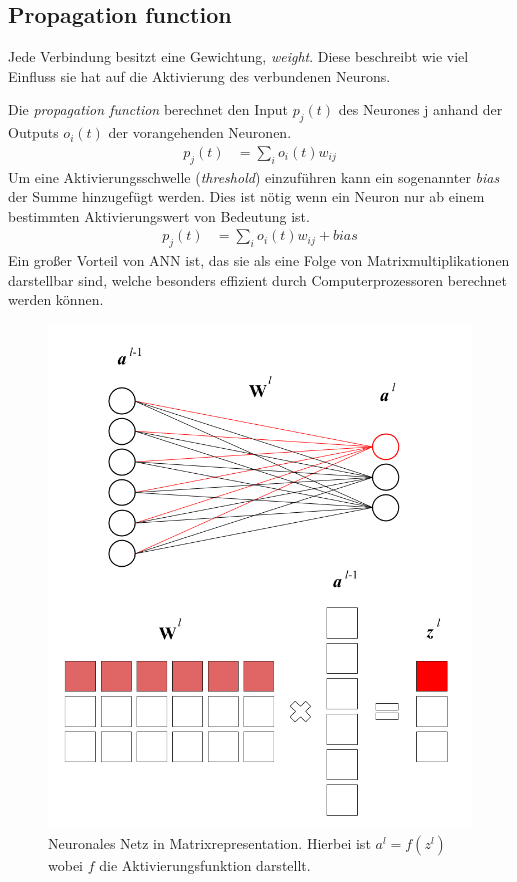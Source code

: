 \documentclass{thesisclass}
\begin{document}
\subsection{Propagation function}

Jede Verbindung besitzt eine Gewichtung, \textit{weight}. Diese beschreibt wie viel Einfluss sie hat auf die Aktivierung des verbundenen Neurons.

Die \textit{propagation function} berechnet den Input $p_j(t)$ des Neurones j anhand der Outputs $o_i(t)$ der vorangehenden Neuronen.
\begin{align*}
p_j(t) &= \sum_{i}^{} o_i(t) w_{ij}
\end{align*}
Um eine Aktivierungsschwelle (\textit{threshold}) einzuführen kann ein sogenannter \textit{bias} der Summe hinzugefügt werden. Dies ist nötig wenn ein Neuron nur ab einem bestimmten Aktivierungswert von Bedeutung ist.
\begin{align*}
p_j(t) &= \sum_{i}^{} o_i(t) w_{ij} + bias
\end{align*}
Ein großer Vorteil von \gls{ANN} ist, das sie als eine Folge von Matrixmultiplikationen darstellbar sind, welche besonders effizient durch Computerprozessoren berechnet werden können.
\begin{center}
\begin{figure}[H]
  		\includegraphics[scale=0.4]{images/NNMatrix.png}
  		\caption{Neuronales Netz in Matrixrepresentation. Hierbei ist $a^{l} = f(z^{l})$ wobei $f$ die Aktivierungsfunktion darstellt. \cite{hallstroem_2016}}
  		\label{fig:Matrixrepresentation eines Neuronalen Netzes}
\end{figure}
\end{center}
\end{document}
